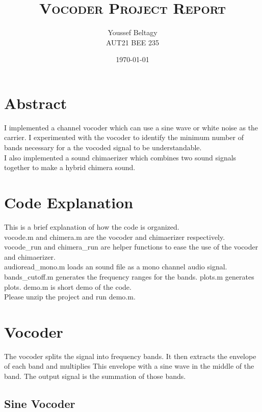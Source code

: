 \documentclass[11pt]{article}
\title{
    \textsc{Vocoder Project Report}
}
\author{
    \Large{Youssef Beltagy} \\
    \large \textsc{AUT21 BEE 235}
}
\date{\today}
\begin{document}
\maketitle %
\pagebreak


\section{Abstract}

I implemented a channel vocoder which can use a sine wave or
white noise as the carrier.
I experimented with the vocoder to identify the minimum number of 
bands necessary for a the vocoded signal to be understandable.\\

I also implemented a sound chimaerizer which combines two sound signals
together to make a hybrid chimera sound.

\section{Code Explanation}

This is a brief explanation of how the code is organized.\\

vocode.m and chimera.m are the vocoder and chimaerizer respectively.
vocode_run and chimera_run are helper functions to ease the use
of the vocoder and chimaerizer.\\

audioread_mono.m loads an sound file as a mono channel audio signal.
bands_cutoff.m generates the frequency ranges for the bands.
plots.m generates plots.
demo.m is short demo of the code.\\

Please unzip the project and run demo.m.



\section{Vocoder}

The vocoder splits the signal into frequency bands.
It then extracts the envelope of each band and multiplies This
envelope with a sine wave in the middle of the band.
The output signal is the summation of those bands.\\

\subsection{Sine Vocoder}
\end{document}

